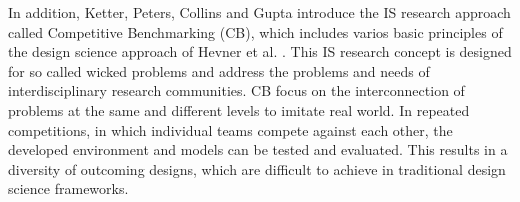 In addition, Ketter, Peters, Collins and Gupta introduce the IS research approach called Competitive Benchmarking (CB), which includes varios basic principles of the design science approach of Hevner et al. \cite{ketter2015competitive}. This IS research concept is designed for so called wicked problems and address the problems and needs of interdisciplinary research communities. CB focus on the interconnection of problems at the same and different levels to imitate real world. In repeated competitions, in which individual teams compete against each other, the developed environment and models can be tested and evaluated. This results in a diversity of outcoming designs, which are difficult to achieve in traditional design science frameworks.  


